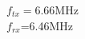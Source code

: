 \documentclass[preview]{standalone}
\begin{document}
\begin{center}
$f_{tx}=$6.66MHz\\$f_{rx}$=6.46MHz
\end{center}
\end{document}

